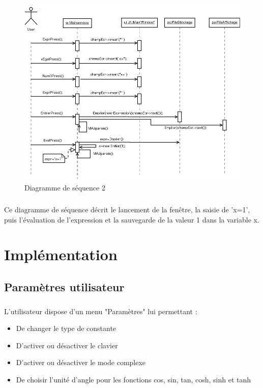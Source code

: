 \documentclass[a4paper,11pt]{report}
\begin{document}
		\begin{figure}[H]
			\center
			\includegraphics[width=16cm]{diag_seq_2.png}
			\caption{Diagramme de séquence 2}
			\label{Diagramme sequence 2}
		\end{figure}
		
		\paragraph{}Ce diagramme de séquence décrit le lancement de la fenêtre, la saisie de 'x=1', puis l'évaluation de l'expression et la sauvegarde de la valeur 1 dans la variable x.

\chapter{Implémentation}

	\section{Paramètres utilisateur}
		\paragraph{}L'utilisateur dispose d'un menu "Paramètres" lui permettant :
		\begin{itemize}
			\item{De changer le type de constante}
			\item{D'activer ou désactiver le clavier}
			\item{D'activer ou désactiver le mode complexe}
			\item{De choisir l'unité d'angle pour les fonctions cos, sin, tan, cosh, sinh et tanh}
		\end{itemize}
		
\end{document}
